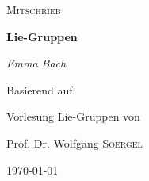 \begin{titlepage}
	\centering
	{\Large \textsc{Mitschrieb}\par}
	\vspace{0.5cm}
	{\huge\bfseries Lie-Gruppen\par}
    \vspace{0.5cm}
	{\Large\itshape Emma Bach\par}
	\vfill
	
	Basierend auf:\par 
	\vspace{1cm}
	Vorlesung Lie-Gruppen von\par
	Prof. Dr. Wolfgang  \textsc{Soergel}\par
	
	\vfill

	{\large \today\par}
\end{titlepage}
